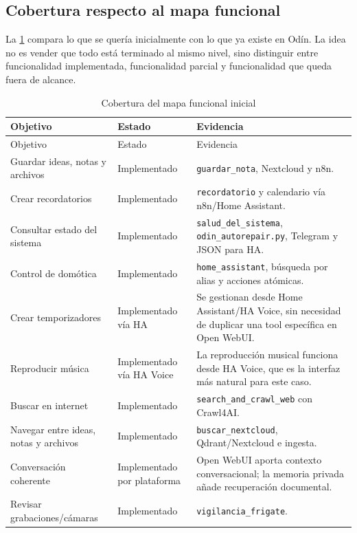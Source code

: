 \subsection{Cobertura respecto al mapa funcional}
La \cref{tab:cobertura-mapa-funcional} compara lo que se quería inicialmente con lo que ya existe en Odín. La idea no es vender que todo está terminado al mismo nivel, sino distinguir entre funcionalidad implementada, funcionalidad parcial y funcionalidad que queda fuera de alcance.

\begingroup
\small
\setlength{\tabcolsep}{3pt}
\begin{longtable}{p{}p{}p{}}
  \caption{Cobertura del mapa funcional inicial}
  \label{tab:cobertura-mapa-funcional}\\
  \toprule
  Objetivo & Estado & Evidencia \\
  \midrule
  \endfirsthead
  \toprule
  Objetivo & Estado & Evidencia \\
  \midrule
  \endhead
  \bottomrule
  \endfoot
  Guardar ideas, notas y archivos & Implementado & \texttt{guardar\_nota}, Nextcloud y n8n. \\
  Crear recordatorios & Implementado & \texttt{recordatorio} y calendario vía n8n/Home Assistant. \\
  Consultar estado del sistema & Implementado & \texttt{salud\_del\_sistema}, \texttt{odin\_autorepair.py}, Telegram y JSON para HA. \\
  Control de domótica & Implementado & \texttt{home\_assistant}, búsqueda por alias y acciones atómicas. \\
  Crear temporizadores & Implementado vía HA & Se gestionan desde Home Assistant/HA Voice, sin necesidad de duplicar una tool específica en Open WebUI. \\
  Reproducir música & Implementado vía HA Voice & La reproducción musical funciona desde HA Voice, que es la interfaz más natural para este caso. \\
  Buscar en internet & Implementado & \texttt{search\_and\_crawl\_web} con Crawl4AI. \\
  Navegar entre ideas, notas y archivos & Implementado & \texttt{buscar\_nextcloud}, Qdrant/Nextcloud e ingesta. \\
  Conversación coherente & Implementado por plataforma & Open WebUI aporta contexto conversacional; la memoria privada añade recuperación documental. \\
  Revisar grabaciones/cámaras & Implementado & \texttt{vigilancia\_frigate}. \\

\end{longtable}
